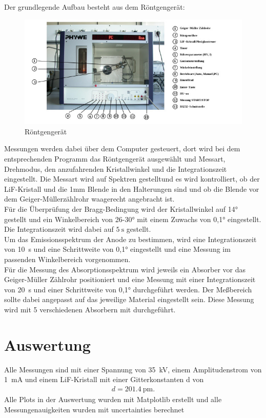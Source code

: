 Der grundlegende Aufbau besteht aus dem Röntgengerät:\cite{V603}
\begin{figure}[H]
    \centering
    \includegraphics[width=\linewidth]{images/Aufbau1.jpg}
    \caption{Röntgengerät}
    \label{fig:1}
\end{figure}
\justifying Messungen werden dabei über dem Computer gesteuert, dort wird bei dem entsprechenden Programm
das Röntgengerät ausgewählt und Messart, Drehmodus, den anzufahrenden Kristallwinkel und die 
Integrationszeit eingestellt. Die Messart wird auf Spektren gestelltund es wird kontrolliert, ob der
LiF-Kristall und die 1mm Blende in den Halterungen sind und ob die Blende vor dem Geiger-Müllerzählrohr
waagerecht angebracht ist. \\
Für die Überprüfung der Bragg-Bedingung wird der Kristallwinkel auf 14° gestellt und ein Winkelbereich von 26-30°
mit einem Zuwachs von 0,1° eingestellt. Die Integrationszeit wird dabei auf $\SI{5}{\second}$ gestellt.\\
Um das Emissionsspektrum der Anode zu bestimmen, wird eine Integrationszeit von \SI{10}{\second} und
eine Schrittweite von 0,1° eingestellt und eine Messung im passenden Winkelbereich vorgenommen.\\
Für die Messung des Absorptionsspektrum wird jeweils ein Absorber vor das Geiger-Müller Zählrohr positioniert
und eine Messung mit einer Integrationszeit von \SI{20}{\second} und einer Schrittweite von 0,1° durchgeführt werden.
Der Meßbereich sollte dabei angepasst auf das jeweilige Material eingestellt sein. Diese Messung 
wird mit 5 verschiedenen Absorbern mit durchgeführt.


\section{Auswertung}
Alle Messungen sind mit einer Spannung von  \SI{35}{\kilo\volt}, einem Amplitudenstrom von
\SI{1}{\milli\ampere} und einem LiF-Kristall mit einer Gitterkonstanten d von \cite{V602}
\begin{align}
    d = \SI{201.4}{\pico\meter} \label{eq:8}.
\end{align}
Alle Plots in der Auswertung wurden mit Matplotlib \cite{matplotlib} erstellt
und alle Messungenauigkeiten wurden mit uncertainties \cite{uncertainties} berechnet

